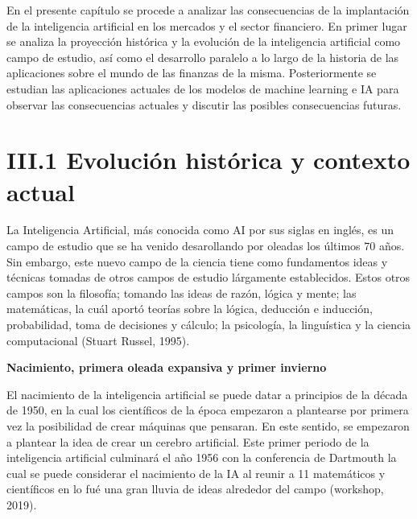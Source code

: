 \documentclass[]{DissertateUSU}
\begin{document}
\noindent En el presente capítulo se procede a analizar las
consecuencias de la implantación de la inteligencia artificial en los
mercados y el sector financiero. En primer lugar se analiza la
proyección histórica y la evolución de la inteligencia artificial como
campo de estudio, así como el desarrollo paralelo a lo largo de la
historia de las aplicaciones sobre el mundo de las finanzas de la misma.
Posteriormente se estudian las aplicaciones actuales de los modelos de
machine learning e IA para observar las consecuencias actuales y
discutir las posibles consecuencias futuras.

\FloatBarrier
{}
\fancyfoot[C]{\thepage}

\section{III.1 \textbf{Evolución histórica y contexto actual}}

\justifying

\noindent La Inteligencia Artificial, más conocida como AI por sus
siglas en inglés, es un campo de estudio que se ha venido desarollando
por oleadas los últimos 70 años. Sin embargo, este nuevo campo de la
ciencia tiene como fundamentos ideas y técnicas tomadas de otros campos
de estudio lárgamente establecidos. Estos otros campos son la filosofía;
tomando las ideas de razón, lógica y mente; las matemáticas, la cuál
aportó teorías sobre la lógica, deducción e inducción, probabilidad,
toma de decisiones y cálculo; la psicología, la linguística y la ciencia
computacional (Stuart Russel, 1995).

\setlength\parskip{5ex}

\textbf{Nacimiento, primera oleada expansiva y primer invierno}

\noindent El nacimiento de la inteligencia artificial se puede datar a
principios de la década de 1950, en la cual los científicos de la época
empezaron a plantearse por primera vez la posibilidad de crear máquinas
que pensaran. En este sentido, se empezaron a plantear la idea de crear
un cerebro artificial. Este primer periodo de la inteligencia artificial
culminará el año 1956 con la conferencia de Dartmouth la cual se puede
considerar el nacimiento de la IA al reunir a 11 matemáticos y
científicos en lo fué una gran lluvia de ideas alrededor del campo
(workshop, 2019).

\setlength\parskip{5ex}
\end{document}
